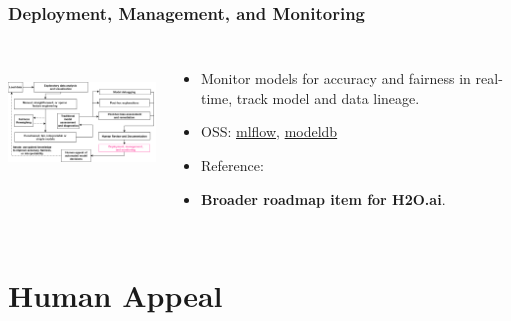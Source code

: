 \documentclass[11pt,
               aspectratio=169,
               hyperref={colorlinks}
               ]{beamer}
\begin{document}
		\begin{frame}

			\frametitle{Deployment, Management, and Monitoring}		
			
			\begin{columns}
	
				\centering
				\includegraphics[height=100pt]{img/deploy.png}
				
				\vspace{-5pt}
				\begin{itemize}
					\item Monitor models for accuracy and fairness in real-time, track model and data lineage.
					\item OSS: \href{https://github.com/mlflow/mlflow}{mlflow}, \href{https://github.com/mitdbg/modeldb}{modeldb}
					\item Reference: 
					\item \textbf{Broader roadmap item for H2O.ai}.
				\end{itemize}
				
			\end{columns}
		
		\end{frame}

	\section{Human Appeal}
\end{document}
